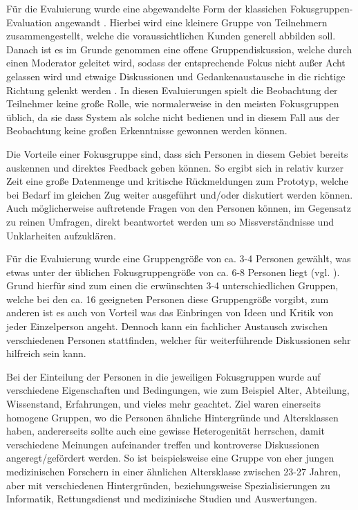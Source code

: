 
Für die Evaluierung wurde eine abgewandelte Form der klassichen Fokusgruppen-Evaluation angewandt  \cite{Christoforakos.2017}.
Hierbei wird eine kleinere Gruppe von Teilnehmern zusammengestellt, welche die voraussichtlichen Kunden generell abbilden soll. 
Danach ist es im Grunde genommen eine offene Gruppendiskussion, welche durch einen Moderator geleitet wird, sodass der entsprechende Fokus nicht außer Acht gelassen wird und etwaige Diskussionen und Gedankenaustausche in die richtige Richtung gelenkt werden \cite{Durrenberger.1999}.
In diesen Evaluierungen spielt die Beobachtung der Teilnehmer keine große Rolle, wie normalerweise in den meisten Fokusgruppen üblich, da sie dass System als solche nicht bedienen und in diesem Fall aus der Beobachtung keine großen Erkenntnisse gewonnen werden können.

Die Vorteile einer Fokusgruppe sind, dass sich Personen in diesem Gebiet bereits auskennen und direktes Feedback geben können. 
So ergibt sich in relativ kurzer Zeit eine große Datenmenge und kritische Rückmeldungen zum Prototyp, welche bei Bedarf im gleichen Zug weiter ausgeführt und/oder diskutiert werden können.
Auch möglicherweise auftretende Fragen von den Personen können, im Gegensatz zu reinen Umfragen, direkt beantwortet werden um so Missverständnisse und Unklarheiten aufzuklären.

Für die Evaluierung wurde eine Gruppengröße von ca. 3-4 Personen gewählt, was etwas unter der üblichen Fokusgruppengröße von ca. 6-8 Personen liegt (vgl. \cite{Madche.}). 
Grund hierfür sind zum einen die erwünschten 3-4 unterschiedlichen Gruppen, welche bei den ca. 16 geeigneten Personen diese Gruppengröße vorgibt, zum anderen ist es auch von Vorteil was das Einbringen von Ideen und Kritik von jeder Einzelperson angeht.
Dennoch kann ein fachlicher Austausch zwischen verschiedenen Personen stattfinden, welcher für weiterführende Diskussionen sehr hilfreich sein kann. 

Bei der Einteilung der Personen in die jeweiligen Fokusgruppen wurde auf verschiedene Eigenschaften und Bedingungen, wie zum Beispiel Alter, Abteilung, Wissenstand, Erfahrungen, und vieles mehr geachtet. 
Ziel waren einerseits homogene Gruppen, wo die Personen ähnliche Hintergründe und Altersklassen haben, andererseits sollte auch eine gewisse Heterogenität herrschen, damit verschiedene Meinungen aufeinander treffen und kontroverse Diskussionen angeregt/gefördert werden.
So ist beispielsweise eine Gruppe von eher jungen medizinischen Forschern in einer ähnlichen Altersklasse zwischen 23-27 Jahren, aber mit verschiedenen Hintergründen, beziehungsweise Spezialisierungen zu Informatik, Rettungsdienst und medizinische Studien und Auswertungen.

